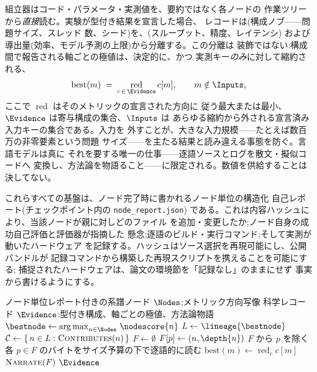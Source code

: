 組立器はコード・パラメータ・実測値を、要約ではなく各ノードの
作業ツリーから\emph{直接}読む。実験が型付き結果を宣言した場合、
レコードは(構成ノブ——問題サイズ、スレッド
数、シード)を、(スループット、精度、レイテンシ)
および導出量(効率、モデル予測の上限)から分離する。この分離は
装飾ではない:構成間で報告される軸ごとの極値は、決定的に、かつ
実測キー\emph{のみ}に対して縮約される、
\begin{equation}\label{eq:reduction}
  \mathrm{best}(m)\;=\;\operatorname*{red}_{c\,\in\,\Evidence} c[m],
  \qquad m \notin \Inputs,
\end{equation}
ここで $\operatorname*{red}$ はそのメトリックの宣言された方向に
従う最大または最小、$\Evidence$ は寄与構成の集合、$\Inputs$ は
あらゆる縮約から外される宣言済み入力キーの集合である。入力を
外すことが、大きな入力規模——たとえば数百万の非零要素という問題
サイズ——を主たる結果と読み違える事態を防ぐ。言語モデルは真に
それを要する唯一の仕事——逐語ソースとログを散文・擬似コードへ
変換し、方法論を物語ること——に限定される。数値を供給することは
決してない。

これらすべての基盤は、ノード完了時に書かれるノード単位の構造化
自己レポート(チェックポイント内の \texttt{node\_report.json})
である。これは内容ハッシュにより、当該ノードが親に対しどのファイル
を追加・変更したか;ノード自身の成功自己評価と評価器が指摘した
懸念;逐語のビルド・実行コマンド;そして実測が動いたハードウェア
を記録する。ハッシュはソース選択を再現可能にし、公開バンドルが
記録コマンドから構築した再現スクリプトを携えることを可能にする;
捕捉されたハードウェアは、論文の環境節を「記録なし」のままにせず
事実から書けるようにする。

\begin{algorithm}[t]
\small
\caption{証拠の組み立て(探索 $\to$ 執筆器入力)。}
\label{alg:evidence-assembly}
\begin{algorithmic}[1]
\Require ノード単位レポート付きの系譜ノード $\Nodes$;メトリック方向写像
\Ensure  科学レコード $\Evidence$:型付き構成、軸ごとの極値、方法論物語
\State $\bestnode \gets \operatorname*{arg\,max}_{n \in \Nodes}\, \nodescore{n}$
\State $L \gets \lineage{\bestnode}$ 
\State $\mathcal{C} \gets \{\, n \in L : \textsc{Contributes}(n) \,\}$
\State $F \gets \emptyset$ 
      \State $F[p] \gets (n, \depth{n})$ 
    \EndIf
  \EndFor
    \State $F$ から $p$ を除く 
  \EndFor
\EndFor
\State 各 $p \in F$ のバイトをサイズ予算の下で逐語的に読む
  \State $\mathrm{best}(m) \gets \operatorname*{red}_{c} c[m]$
\EndFor
\State $\textsc{Narrate}(F)$
\State \Return $\Evidence$
\end{algorithmic}
\end{algorithm}

